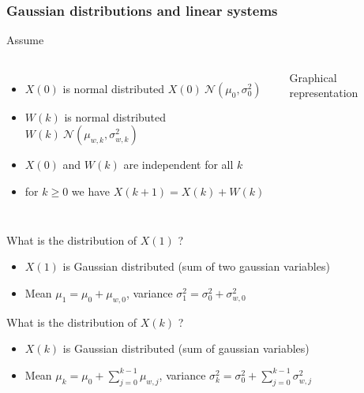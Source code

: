 \begin{frame}
	\frametitle{Gaussian distributions and linear systems}
	Assume 
	\begin{columns}
		\begin{itemize}
			\item $X(0)$ is normal distributed $X(0)~\mathcal{N}(\mu_0, \sigma_0^2)$
			\item $W(k)$ is normal distributed $W(k)~\mathcal{N}(\mu_{w,k}, \sigma_{w,k}^2)$
			\item $X(0)$ and $W(k)$ are independent for all $k$
			\item for $k\geq0$ we have $X(k+1) =X(k) + W(k)$
		\end{itemize}	
		\begin{block}{Graphical representation}
		\end{block}
	\end{columns}
	
	\vspace*{0.5em}

	 What is the distribution of $X(1)$ ?
	\begin{itemize}
		\item $X(1)$ is Gaussian distributed (sum of two gaussian variables)
		\item Mean $\mu_1=\mu_0+\mu_{w,0}$, variance $\sigma_1^2 = \sigma_0^2 + \sigma_{w,0}^2$
	\end{itemize}

	\vspace*{0.5em}
	 What is the distribution of $X(k)$ ?
	\begin{itemize}
		\item $X(k)$ is Gaussian distributed (sum of gaussian variables)
		\item Mean $\mu_k=\mu_0+\sum_{j=0}^{k-1}\mu_{w,j}$, variance $\sigma_k^2=\sigma_0^2 + \sum_{j=0}^{k-1}\sigma_{w,j}^2$
	\end{itemize}
\end{frame}


